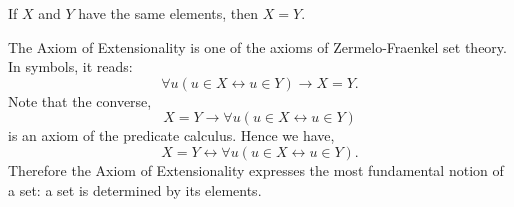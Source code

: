\documentclass[12pt]{article}
\begin{document}
If $X$ and $Y$ have the same elements, then $X = Y$.

The Axiom of Extensionality is one of the axioms of Zermelo-Fraenkel set theory.
In symbols, it reads:
\[
\forall u(u \in X \leftrightarrow u \in Y) \rightarrow X = Y.
\]
Note that the converse,
\[
X = Y \rightarrow \forall u(u \in X \leftrightarrow u \in Y)
\]
is an axiom of the predicate calculus.  Hence we have,
\[
X = Y \leftrightarrow \forall u(u \in X \leftrightarrow u \in Y).
\]
Therefore the Axiom of Extensionality expresses the most fundamental notion of a set: a set is determined by its elements.
\end{document}
